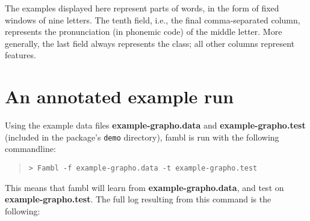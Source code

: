 \documentclass[11pt]{article}
\begin{document}
The examples displayed here represent parts of words, in the form of
fixed windows of nine letters. The tenth field, i.e., the final
comma-separated column, represents the pronunciation (in phonemic
code) of the middle letter. More generally, the last field always
represents the class; all other columns represent features.

\section{An annotated example run}
\label{examples}

Using the example data files {\bf example-grapho.data} and {\bf
  example-grapho.test} (included in the package's {\tt demo}
directory), {\sc fambl} is run with the following commandline:

\begin{quote}
{\footnotesize
\begin{verbatim}
> Fambl -f example-grapho.data -t example-grapho.test
\end{verbatim}
}
\end{quote}

This means that {\sc fambl} will learn from {\bf example-grapho.data},
and test on {\bf example-grapho.test}.  The full log resulting from
this command is the following:
\end{document}
